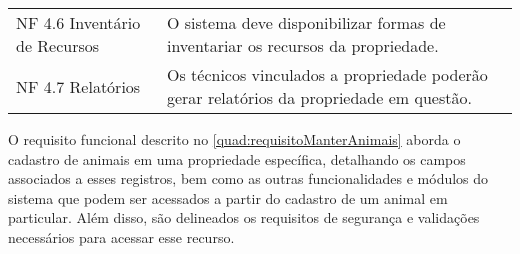 \begin{tabframed}[htb]
\begin{tabular}{|l|l|}
    NF 4.6 Inventário de Recursos         &
    \multicolumn{1}{|p{8cm}|}{\raggedright O sistema deve disponibilizar formas de inventariar os recursos da propriedade.}
    \\ \cline{1-2}

    NF 4.7 Relatórios                     &
    \multicolumn{1}{|p{8cm}|}{\raggedright Os técnicos vinculados a propriedade poderão gerar relatórios da propriedade em questão.}
    \\ \cline{1-2}
  \end{tabular}
  \fonte{} %
\end{tabframed}

O requisito funcional descrito no \autoref{quad:requisitoManterAnimais}  aborda o cadastro de animais em uma propriedade específica, detalhando os campos associados a esses registros, bem como as outras funcionalidades e módulos do sistema que podem ser acessados a partir do cadastro de um animal em particular. Além disso, são delineados os requisitos de segurança e validações necessários para acessar esse recurso.

